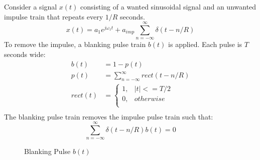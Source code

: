 \documentclass{article}
\begin{document}
Consider a signal $x(t)$ consisting of a wanted sinusoidal signal and an unwanted impulse train that repeats every $1/R$ seconds.
\begin{equation}
x(t) = a_1 e^{j \omega_1 t} + a_{imp}\sum_{n=-\infty}^{\infty}\delta(t-n/R)
\end{equation}
To remove the impulse, a blanking pulse train $b(t)$ is applied.  Each pulse is $T$ seconds wide:
\begin{equation}
\begin{split}
b(t) &= 1 - p(t) \\
p(t) &= \sum_{n=-\infty}^{\infty}rect(t-n/R) \\
rect(t) &= 
	\begin{cases}
      1, & |t| <= T/2 \\
      0, & otherwise \\
	\end{cases} \\
\end{split}
\end{equation} 
The blanking pulse train removes the impulse pulse train such that:
\begin{equation}
\sum_{n=-\infty}^{\infty}\delta(t-n/R) b(t) = 0
\end{equation}
\begin{figure}[h]
\caption{Blanking Pulse $b(t)$ }
\vspace{5mm}
\label{fig:rect_time}
\centering
{}
\end{figure}
\end{document}
